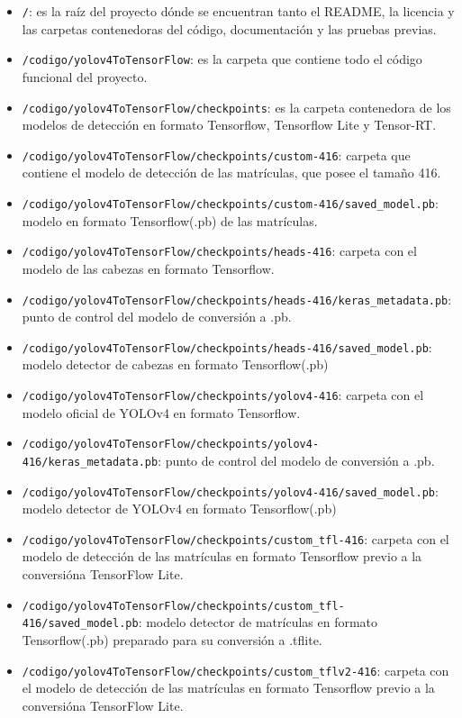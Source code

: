 \begin{itemize}
    \tightlist
    \item \texttt{/}: es la raíz del proyecto dónde se encuentran tanto el README, la licencia y las carpetas contenedoras del código, documentación y las pruebas previas.
    \item \texttt{/codigo/yolov4ToTensorFlow}: es la carpeta que contiene todo el código funcional del proyecto.
    \item \texttt{/codigo/yolov4ToTensorFlow/checkpoints}: es la carpeta contenedora de los modelos de detección en formato Tensorflow, Tensorflow Lite y Tensor-RT.
    \item \texttt{/codigo/yolov4ToTensorFlow/checkpoints/custom-416}: carpeta que contiene el modelo de detección de las matrículas, que posee el tamaño 416.
    \item \texttt{/codigo/yolov4ToTensorFlow/checkpoints/custom-416/saved\_model.pb}: modelo en formato Tensorflow(.pb) de las matrículas.
    \item \texttt{/codigo/yolov4ToTensorFlow/checkpoints/heads-416}: carpeta con el modelo de las cabezas en formato Tensorflow.
    \item \texttt{/codigo/yolov4ToTensorFlow/checkpoints/heads-416/keras\_metadata.pb}: punto de control del modelo de conversión a .pb.
    \item \texttt{/codigo/yolov4ToTensorFlow/checkpoints/heads-416/saved\_model.pb}: modelo detector de cabezas en formato Tensorflow(.pb)
    \item \texttt{/codigo/yolov4ToTensorFlow/checkpoints/yolov4-416}: carpeta con el modelo oficial de YOLOv4 en formato Tensorflow.
    \item \texttt{/codigo/yolov4ToTensorFlow/checkpoints/yolov4-416/keras\_metadata.pb}: punto de control del modelo de conversión a .pb.
    \item \texttt{/codigo/yolov4ToTensorFlow/checkpoints/yolov4-416/saved\_model.pb}: modelo detector de YOLOv4 en formato Tensorflow(.pb)
    \item \texttt{/codigo/yolov4ToTensorFlow/checkpoints/custom\_tfl-416}: carpeta con el modelo de detección de las matrículas en formato Tensorflow previo a la conversióna TensorFlow Lite.
    \item \texttt{/codigo/yolov4ToTensorFlow/checkpoints/custom\_tfl-416/saved\_model.pb}: modelo detector de matrículas en formato Tensorflow(.pb) preparado para su conversión a .tflite.
    \item \texttt{/codigo/yolov4ToTensorFlow/checkpoints/custom\_tflv2-416}: carpeta con el modelo de detección de las matrículas en formato Tensorflow previo a la conversióna TensorFlow Lite.

\end{itemize}
